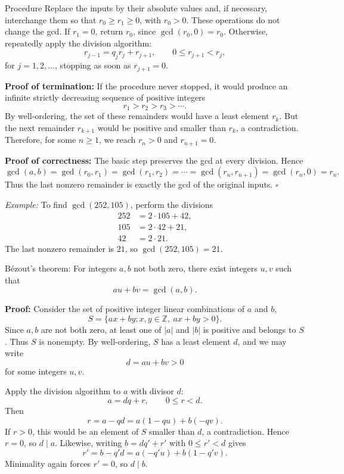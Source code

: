 \documentclass[a4paper,11pt,abstracton]{scrartcl}
\theoremstyle{dotlessP}
\theoremstyle{dotlessS}
\theoremstyle{remark}
\theoremstyle{definition}
\begin{document}
\begin{subbox}{Procedure}
Replace the inputs by their absolute values and, if necessary, interchange
them so that $r_0\geq r_1\geq0$, with $r_0>0$.
These operations do not change the gcd. If $r_1=0$, return $r_0$,
since $\gcd(r_0,0)=r_0$. Otherwise, repeatedly apply the division
algorithm:
\[
    r_{j-1}=q_jr_j+r_{j+1},\qquad 0\leq r_{j+1}<r_j,
\]
for $j=1,2,\ldots$, stopping as soon as $r_{j+1}=0$.
\end{subbox}

\textbf{Proof of termination:}
If the procedure never stopped, it would produce an infinite strictly
decreasing sequence of positive integers
\[
    r_1>r_2>r_3>\cdots.
\]
By well-ordering, the set of these remainders would have a least element
$r_k$. But the next remainder $r_{k+1}$ would be positive and smaller
than $r_k$, a contradiction. Therefore, for some $n\geq1$, we reach
$r_n>0$ and $r_{n+1}=0$.


\textbf{Proof of correctness:}
The basic step preserves the gcd at every division. Hence
\[
    \gcd(a,b)=\gcd(r_0,r_1)
    =\gcd(r_1,r_2)=\cdots
    =\gcd(r_n,r_{n+1})=\gcd(r_n,0)=r_n.
\]
Thus the last nonzero remainder is exactly the gcd of the original
inputs.
\hfill$\square$



\begin{example_box}
\textit{Example:}
To find $\gcd(252,105)$, perform the divisions
\begin{align*}
    252&=2\cdot105+42,\\
    105&=2\cdot42+21,\\
    42&=2\cdot21.
\end{align*}
The last nonzero remainder is $21$, so $\gcd(252,105)=21$.
\end{example_box}


\begin{mainbox}{B\'ezout's theorem:}
For integers $a,b$ not both zero, there exist integers $u,v$ such that
\[
    au+bv=\gcd(a,b).
\]
\end{mainbox}

\textbf{Proof:}
Consider the set of positive integer linear combinations of $a$ and $b$,
\[
    S=\{ax+by : x,y\in\mathbb{Z},\ ax+by>0\}.
\]
Since $a,b$ are not both zero, at least one of $|a|$ and $|b|$ is
positive and belongs to $S$. Thus $S$ is nonempty. By well-ordering,
$S$ has a least element $d$, and we may write
\[
    d=au+bv>0
\]
for some integers $u,v$.

Apply the division algorithm to $a$ with divisor $d$:
\[
    a=dq+r,\qquad 0\leq r<d.
\]
Then
\[
    r=a-qd=a(1-qu)+b(-qv).
\]
If $r>0$, this would be an element of $S$ smaller than $d$, a
contradiction. Hence $r=0$, so $d\mid a$.
Likewise, writing $b=dq'+r'$ with $0\leq r'<d$ gives
\[
    r'=b-q'd=a(-q'u)+b(1-q'v).
\]
Minimality again forces $r'=0$, so $d\mid b$.
\end{document}
